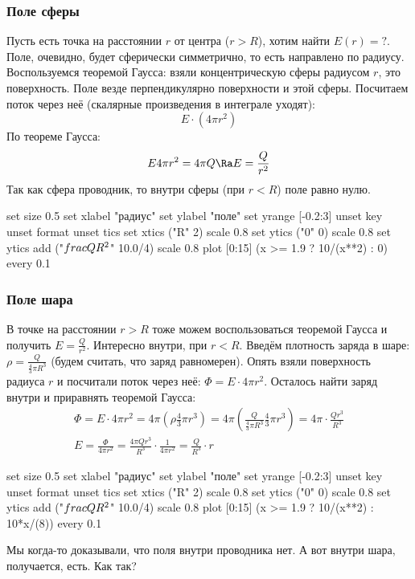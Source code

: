		\subsubsection{Поле сферы}
			Пусть есть точка на расстоянии $r$ от центра ($r>R$), хотим найти $E(r)=?$.
			Поле, очевидно, будет сферически симметрично, то есть направлено по радиусу.
			Воспользуемся теоремой Гаусса: взяли концентрическую сферы радиусом $r$, это поверхность.
			Поле везде перпендикулярно поверхности и этой сферы.
			Посчитаем поток через неё (скалярные произведения в интеграле уходят):
			\[E \cdot (4\pi r^2)\]
			По теореме Гаусса:
			\[E 4 \pi r^2 = 4\pi Q \Ra E = \frac{Q}{r^2}\]
			Так как сфера проводник, то внутри сферы (при $r<R$) поле равно нулю.
			\begin{center}
			\begin{gnuplot}
set size 0.5
set xlabel "радиус"
set ylabel "поле"
set yrange [-0.2:3]
unset key
unset format
unset tics
set xtics ("R" 2) scale 0.8
set ytics ("0" 0) scale 0.8
set ytics add ("$\\frac Q {R^2}$" 10.0/4) scale 0.8
plot [0:15] (x >= 1.9 ? 10/(x**2) : 0) every 0.1
			\end{gnuplot}
			\end{center}
		\subsubsection{Поле шара}
			В точке на расстоянии $r>R$ тоже можем воспользоваться теоремой Гаусса и получить $E=\frac{Q}{r^2}$.
			Интересно внутри, при $r<R$.
			Введём плотность заряда в шаре: $\rho = \frac{Q}{\frac43\pi R^3}$ (будем считать, что заряд равномерен).
			Опять взяли поверхность радиуса $r$ и посчитали поток через неё: $\Phi = E \cdot 4\pi r^2$.
			Осталось найти заряд внутри и приравнять теоремой Гаусса:
			\begin{gather*}
			\Phi = E \cdot 4\pi r^2
			= 4\pi \left(\rho \frac43\pi r^3\right)
			= 4\pi \left(\frac{Q}{\frac 43\pi R^3} \frac43\pi r^3\right)
			= 4\pi \cdot \frac{Qr^3}{R^3} \\
			E
				= \frac{\Phi}{4\pi r^2} = \frac{4\pi Qr^3}{R^3} \cdot \frac{1}{4\pi r^2}
				= \frac{Q}{R^3} \cdot r
			\end{gather*}
			\begin{center}
			\begin{gnuplot}
set size 0.5
set xlabel "радиус"
set ylabel "поле"
set yrange [-0.2:3]
unset key
unset format
unset tics
set xtics ("R" 2) scale 0.8
set ytics ("0" 0) scale 0.8
set ytics add ("$\\frac Q {R^2}$" 10.0/4) scale 0.8
plot [0:15] (x >= 1.9 ? 10/(x**2) : 10*x/(8)) every 0.1
			\end{gnuplot}
			\end{center}
			\begin{Exercise}
				Мы когда-то доказывали, что поля внутри проводника нет.
				А вот внутри шара, получается, есть.
				Как так?
			\end{Exercise}
